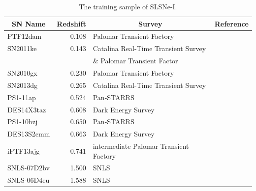 \begin{table}
\begin{center}
  \caption{The training sample of SLSNe-I.}
\label{tab:PubishedSLSNe}
\begin{tabular}{|l|r|l|l|}
\hline
  \multicolumn{1}{|c|}{SN Name} &
  \multicolumn{1}{c|}{Redshift} &
  \multicolumn{1}{c|}{Survey} &
  \multicolumn{1}{c|}{Reference} \\
\hline
  PTF12dam & 0.108 & Palomar Transient Factory & \citep{2013Natur.502..346N}\\
  SN2011ke & 0.143 & Catalina Real-Time Transient Survey & \citet{2013ApJ...770..128I}\\
  &&\& Palomar Transient Factor & \\
  SN2010gx & 0.230 & Palomar Transient Factory & \cite{2010ApJ...724L..16P}\\
  SN2013dg & 0.265 & Catalina Real-Time Transient Survey & \cite{2014MNRAS.444.2096N} \\
  PS1-11ap & 0.524 & Pan-STARRS & \cite{2014MNRAS.437..656M}\\
  DES14X3taz & 0.608 & Dark Energy Survey & \cite{2016ApJ...818L...8S} \\
  PS1-10bzj & 0.650 & Pan-STARRS & \cite{2013ApJ...771...97L}\\
  DES13S2cmm & 0.663 & Dark Energy Survey & \cite{2015MNRAS.449.1215P} \\
  iPTF13ajg & 0.741 & intermediate Palomar Transient Factory &\cite{2014ApJ...797...24V}\\
  SNLS-07D2bv & 1.500 & SNLS &\cite{2013ApJ...779...98H}\\
  SNLS-06D4eu & 1.588 & SNLS &\cite{2013ApJ...779...98H}\\
\hline\end{tabular}
\end{center}
\end{table}
